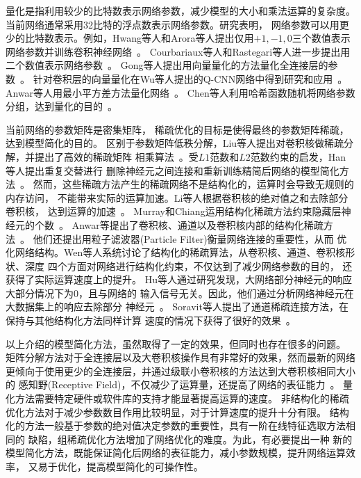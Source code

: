 \documentclass[doctor]{ustcthesis}
\begin{document}
量化是指利用较少的比特数表示网络参数，减少模型的大小和乘法运算的复杂度。
当前网络通常采用32比特的浮点数表示网络参数。研究表明，
网络参数可以用更少的比特数表示。例如，Hwang等人和Arora等人提出仅用$+1, -1,
0$三个数值表示网络参数并训练卷积神经网络~\cite{hwang2014fixed,arora2014provable}。
Courbariaux等人和Rastegari等人进一步提出用二个数值表示网络参数~\cite{courbariaux2015binaryconnect,rastegari2016xnor}。
Gong等人提出用向量量化的方法量化全连接层的参数~\cite{gong2014compressing}。
针对卷积层的向量量化在Wu等人提出的Q-CNN网络中得到研究和应用~\cite{wu2016quantized}。
Anwar等人用最小平方差方法量化网络~\cite{anwar2015fixed}。
Chen等人利用哈希函数随机将网络参数分组，达到量化的目的~\cite{chen2015compressing}。

当前网络的参数矩阵是密集矩阵， 稀疏优化的目标是使得最终的参数矩阵稀疏，
达到模型简化的目的。
区别于参数矩阵低秩分解，Liu等人提出对卷积核做稀疏分解，并提出了高效的稀疏矩阵
相乘算法~\cite{liu2015sparse}。受$L1$范数和$L2$范数约束的启发，Han等人提出重复交替进行
删除神经元之间连接和重新训练精简后网络的模型简化方法~\cite{han2015learning,han2015deep}。
然而，这些稀疏方法产生的稀疏网络不是结构化的，运算时会导致无规则的内存访问，
不能带来实际的运算加速。Li等人根据卷积核的绝对值之和去除部分卷积核，
达到运算的加速~\cite{li2016pruning}。
Murray和Chiang运用结构化稀疏方法约束隐藏层神经元的个数~\cite{murray2015auto}。
Anwar等提出了卷积核、通道以及卷积核内部的结构化稀疏方法~\cite{anwar2015structured}。
他们还提出用粒子滤波器(Particle Filter)衡量网络连接的重要性，从而
优化网络结构。Wen等人系统讨论了结构化的稀疏算法，从卷积核、通道、卷积核形状、深度
四个方面对网络进行结构化约束，不仅达到了减少网络参数的目的，
还获得了实际运算速度上的提升。
Hu等人通过研究发现，大网络部分神经元的响应大部分情况下为0，且与网络的
输入信号无关。因此，他们通过分析网络神经元在大数据集上的响应去除部分
神经元~\cite{hu2016network}。
Soravit等人提出了通道稀疏连接方法，在保持与其他结构化方法同样计算
速度的情况下获得了很好的效果~\cite{changpinyo2017power}。

以上介绍的模型简化方法，虽然取得了一定的效果，但同时也存在很多的问题。
矩阵分解方法对于全连接层以及大卷积核操作具有非常好的效果，然而最新的网络
更倾向于使用更少的全连接层，并通过级联小卷积核的方法达到大卷积核相同大小的
感知野(Receptive Field)，不仅减少了运算量，还提高了网络的表征能力~\cite{szegedy2016rethinking}。
量化方法需要特定硬件或软件库的支持才能显著提高运算的速度。
非结构化的稀疏优化方法对于减少参数数目作用比较明显，对于计算速度的提升十分有限。
结构化的方法一般基于参数的绝对值决定参数的重要性，具有一阶在线特征选取方法相同的
缺陷，组稀疏优化方法增加了网络优化的难度。为此，有必要提出一种
新的模型简化方法，既能保证简化后网络的表征能力，减小参数规模，提升网络运算效率，
又易于优化，提高模型简化的可操作性。
\end{document}
